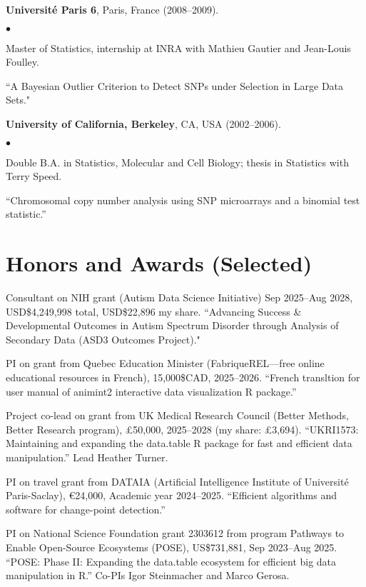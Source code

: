 \documentclass[margin,line]{res}
\newenvironment{list2}{
  \begin{list}{$\bullet$}{%
      \setlength{\itemsep}{0in}
      \setlength{\parsep}{0in} \setlength{\parskip}{0in}
      \setlength{\topsep}{0in} \setlength{\partopsep}{0in} 
      \setlength{\leftmargin}{0.2in}}}{\end{list}}
\begin{document}
\begin{resume}
{\bf Universit\'e Paris 6}, Paris, France (2008--2009).\\
\vspace*{-.1in}
\begin{list2}
\item[] Master of Statistics, internship at INRA with Mathieu Gautier and Jean-Louis Foulley.
\item[] ``A Bayesian Outlier Criterion to Detect SNPs under Selection in Large Data Sets."
\end{list2}

{\bf University of California, Berkeley}, CA, USA (2002--2006).\\
\vspace*{-.1in}
\begin{list2}
\item[] Double B.A. in Statistics, Molecular and Cell Biology; thesis in Statistics with Terry Speed.
\item[] ``Chromosomal copy number analysis using SNP microarrays and a binomial test statistic.'' 
\end{list2}

\section{\sc Honors and Awards (Selected)}

Consultant on NIH grant (Autism Data Science Initiative) Sep 2025--Aug 2028, USD\$4,249,998 total, USD\$22,896 my share. ``Advancing Success \& Developmental Outcomes in Autism Spectrum Disorder through Analysis of Secondary Data (ASD3 Outcomes Project)."

PI on grant from Quebec Education Minister (FabriqueREL---free online
educational resources in French), 15,000\$CAD, 2025--2026. ``French
transltion for user manual of animint2 interactive data visualization
R package.''

Project co-lead on grant from UK Medical Research Council (Better
Methods, Better Research program), £50,000, 2025--2028 (my share:
£3,694). ``UKRI1573: Maintaining and expanding the data.table R
package for fast and efficient data manipulation.'' Lead Heather
Turner.

PI on travel grant from DATAIA (Artificial Intelligence Institute of
Université Paris-Saclay), €24,000, Academic year
2024--2025. ``Efficient algorithms and software for change-point
detection.''

PI on National Science Foundation grant 2303612 from program Pathways to Enable Open-Source Ecosystems (POSE), US\$731,881, Sep
2023--Aug 2025. ``POSE: Phase II: Expanding the data.table ecosystem
for efficient big data manipulation in R.'' Co-PIs Igor Steinmacher
and Marco Gerosa.


\end{resume}
\end{document}
